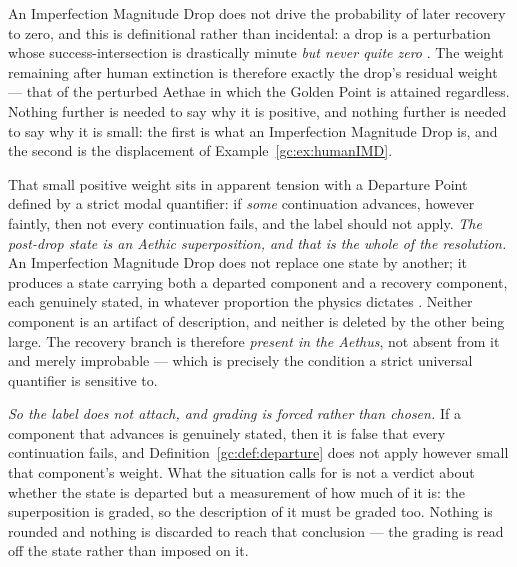 \begin{remark}\label{gc:rem:boltzmann}
An Imperfection Magnitude Drop does not drive the probability of later
recovery to zero, and this is definitional rather than incidental: a
drop is a perturbation whose success-intersection is drastically minute
\emph{but never quite zero} \cite{Nexus}. The weight remaining after
human extinction is therefore exactly the drop's residual weight ---
that of the perturbed Aethae in which the Golden Point is attained
regardless. Nothing further is needed to say why it is positive, and
nothing further is needed to say why it is small: the first is what an
Imperfection Magnitude Drop is, and the second is the displacement of
Example~\ref{gc:ex:humanIMD}.

That small positive weight sits in apparent tension with a Departure
Point defined by a strict modal quantifier: if \emph{some} continuation
advances, however faintly, then not every continuation fails, and the
label should not apply. \emph{The post-drop state is an Aethic superposition, and that is the
whole of the resolution.} An Imperfection Magnitude Drop does not
replace one state by another; it produces a state carrying both a
departed component and a recovery component, each genuinely stated, in
whatever proportion the physics dictates \cite{AethusTree}. Neither
component is an artifact of description, and neither is deleted by the
other being large. The recovery branch is therefore \emph{present in
the Aethus}, not absent from it and merely improbable --- which is
precisely the condition a strict universal quantifier is sensitive to.

\emph{So the label does not attach, and grading is forced rather than
chosen.} If a component that advances is genuinely stated, then it is
false that every continuation fails, and
Definition~\ref{gc:def:departure} does not apply however small that
component's weight. What the situation calls for is not a verdict about
whether the state is departed but a measurement of how much of it is:
the superposition is graded, so the description of it must be graded
too. Nothing is rounded and nothing is discarded to reach that
conclusion --- the grading is read off the state rather than imposed on
it.


\end{remark}
